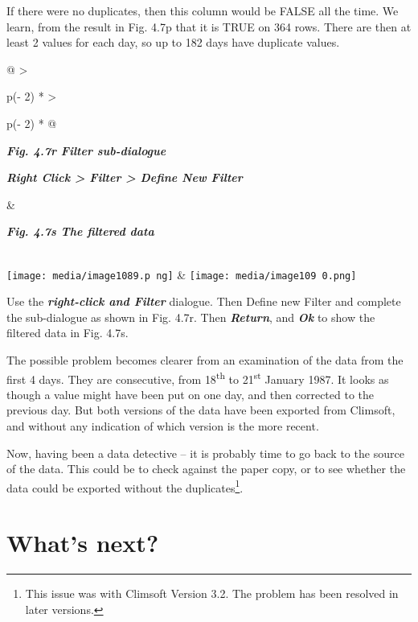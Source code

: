 \documentclass[
  letterpaper,
  DIV=11,
  numbers=noendperiod]{scrreprt}
\begin{document}
If there were no duplicates, then this column would be FALSE all the
time. We learn, from the result in Fig. 4.7p that it is TRUE on 364
rows. There are then at least 2 values for each day, so up to 182 days
have duplicate values.

\begin{longtable}[]{@{}
  >{\raggedright\arraybackslash}p{(\columnwidth - 2\tabcolsep) * }
  >{\raggedright\arraybackslash}p{(\columnwidth - 2\tabcolsep) * }@{}}
\toprule\noalign{}
\begin{minipage}[b]{\linewidth}\raggedright
\textbf{\emph{Fig. 4.7r Filter sub-dialogue}}

\textbf{\emph{Right Click \textgreater{} Filter \textgreater{} Define
New Filter}}
\end{minipage} & \begin{minipage}[b]{\linewidth}\raggedright
\textbf{\emph{Fig. 4.7s The filtered data}}
\end{minipage} \\
\midrule\noalign{}
\endhead
\bottomrule\noalign{}
\endlastfoot
\texttt{[image: media/image1089.p ng]}
&
\texttt{[image: media/image109 0.png]} \\
\end{longtable}

Use the \textbf{\emph{right-click and Filter}} dialogue. Then Define new
Filter and complete the sub-dialogue as shown in Fig. 4.7r. Then
\textbf{\emph{Return}}, and \textbf{\emph{Ok}} to show the filtered data
in Fig. 4.7s.

The possible problem becomes clearer from an examination of the data
from the first 4 days. They are consecutive, from 18\textsuperscript{th}
to 21\textsuperscript{st} January 1987. It looks as though a value might
have been put on one day, and then corrected to the previous day. But
both versions of the data have been exported from Climsoft, and without
any indication of which version is the more recent.

Now, having been a data detective -- it is probably time to go back to
the source of the data. This could be to check against the paper copy,
or to see whether the data could be exported without the
duplicates\footnote{This issue was with Climsoft Version 3.2. The
  problem has been resolved in later versions.}.

\section{What's next?}\label{whats-next}
\end{document}
